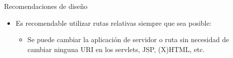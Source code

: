\begin{slide}{Recomendaciones de diseño}

  \begin{itemize}
  \item Es recomendable utilizar rutas relativas siempre que sea
    posible:
    \begin{itemize}
    \item Se puede cambiar la aplicación de servidor o ruta sin
      necesidad de cambiar ninguna URI en los servlets, JSP, (X)HTML,
      etc.
    \end{itemize}
  \end{itemize}

\end{slide}




